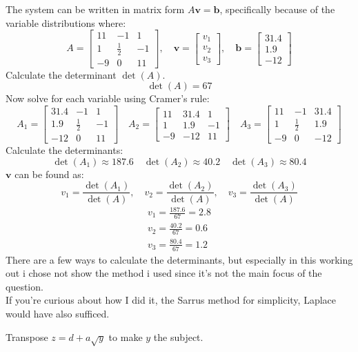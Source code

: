 \documentclass[a4paper, 12pt]{report}
\def\ni{blue!20!white}
\begin{document}
    The system can be written in matrix form \( A\mathbf{v} = \mathbf{b} \), specifically because of the variable distributions where:
    \[A = \begin{bmatrix} 11 & -1 & 1 \\ 1 & \frac{1}{2} & -1 \\ -9 & 0 & 11 \end{bmatrix}, \quad \mathbf{v} = \begin{bmatrix} v_1 \\ v_2 \\ v_3 \end{bmatrix}, \quad \mathbf{b} = \begin{bmatrix} 31.4 \\ 1.9 \\ -12 \end{bmatrix}\]
    Calculate the determinant \(\det(A)\).
    \[\det(A) = 67\]
    Now solve for each variable using Cramer's rule:
    \[A_1 = \begin{bmatrix} 31.4 & -1 & 1 \\ 1.9 & \frac{1}{2} & -1 \\ -12 & 0 & 11 \end{bmatrix}
    \quad 
    A_2 = \begin{bmatrix} 11 & 31.4 & 1 \\ 1 & 1.9 & -1 \\ -9 & -12 & 11 \end{bmatrix}
    \quad 
    A_3 = \begin{bmatrix} 11 & -1 & 31.4 \\ 1 & \frac{1}{2} & 1.9 \\ -9 & 0 & -12 \end{bmatrix}\]
    Calculate the determinants:
    \[\det(A_1)\approx187.6 \quad \det(A_2)\approx40.2\quad \det(A_3)\approx80.4\]
    \(\mathbf{v}\) can be found as:
    \[v_1 = \frac{\det(A_1)}{\det(A)}, \quad v_2 = \frac{\det(A_2)}{\det(A)}, \quad v_3 = \frac{\det(A_3)}{\det(A)}\]
    \[\boxed{\begin{array}{rcl}v_1=\frac{187.6}{67}=2.8\\[6pt]v_2=\frac{40.2}{67}=0.6\\[6pt]v_3=\frac{80.4}{67}=1.2\end{array}}\]
    There are a few ways to calculate the determinants, but especially in this working out i chose not show the method i used since it’s not the main focus of the question.\\[6pt]
    If you’re curious about how I did it, the Sarrus method for simplicity, Laplace would have also sufficed.
    \newpage    
    \begin{tcolorbox}[title=\color{black}{\section{Q6}}, colback=white, colframe=\ni, boxrule=1mm, width=1\textwidth]
        Transpose \( z = d + a \sqrt{y} \) to make \( y \) the subject.
    \end{tcolorbox}
\end{document}
